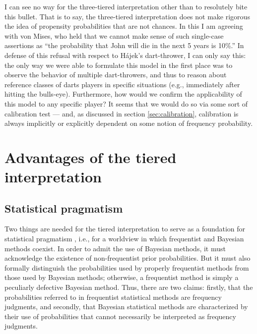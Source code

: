 \documentclass[letterpaper,12pt]{article}
\newcommand{\hajek}{H\'ajek}
\begin{document}
I can see no way for the three-tiered interpretation other than to resolutely bite this bullet. That is to say, the three-tiered interpretation does not make rigorous the idea of propensity probabilities that are not chances. In this I am agreeing with von Mises, who held that we cannot make sense of such single-case assertions as ``the probability that John will die in the next 5 years is 10\%.'' In defense of this refusal with respect to \hajek's dart-thrower, I can only say this: the only way we were able to formulate this model in the first place was to observe the behavior of multiple dart-throwers, and thus to reason about reference classes of darts players in specific situations (e.g., immediately after hitting the bulls-eye). Furthermore, how would we confirm the applicability of this model to any specific player? It seems that we would do so via some sort of calibration test --- and, as discussed in section \ref{sec:calibration}, calibration is always implicitly or explicitly dependent on some notion of frequency probability.


\section{Advantages of the tiered interpretation}

\subsection{Statistical pragmatism}
Two things are needed for the tiered interpretation to serve as a foundation for statistical pragmatism \citep{senn2011you}, i.e., for a worldview in which frequentist and Bayesian methods coexist. In order to admit the use of Bayesian methods, it must acknowledge the existence of non-frequentist prior probabilities. But it must also formally distinguish the probabilities used by properly frequentist methods from those used by Bayesian methods; otherwise, a frequentist method is simply a peculiarly defective Bayesian method. Thus, there are two claims: firstly, that the probabilities referred to in frequentist statistical methods are frequency judgments, and secondly, that Bayesian statistical methods are characterized by their use of probabilities that cannot necessarily be interpreted as frequency judgments.
\end{document}
